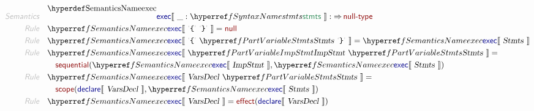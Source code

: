 \begin{align*}
  \KEY{Semantics} \quad
  & \SEMDECL{exec} \LEFTPHRASE \ \_ : \SYNREF{stmts} \ \RIGHTPHRASE  
    :  \TO \NAMEHYPER{../../../../../Funcons-beta/Values/Primitive}{Null}{null-type} 
\\
  \KEY{Rule} \quad
    & \SEMREF{exec} \LEFTPHRASE \
                            \LEX{{\LEFTBRACE}} \ \LEX{{\RIGHTBRACE}} \
                          \RIGHTPHRASE  = 
      \NAMEHYPER{../../../../../Funcons-beta/Values/Primitive}{Null}{null}
\\
  \KEY{Rule} \quad
    & \SEMREF{exec} \LEFTPHRASE \
                            \LEX{{\LEFTBRACE}} \ \VARREF{Stmts} \ \LEX{{\RIGHTBRACE}} \
                          \RIGHTPHRASE  = 
      \SEMREF{exec} \LEFTPHRASE \
                            \VAR{Stmts} \
                          \RIGHTPHRASE 
\\
  \KEY{Rule} \quad
    & \SEMREF{exec} \LEFTPHRASE \
                            \VARREF{ImpStmt} \ \VARREF{Stmts} \
                          \RIGHTPHRASE  = \\&\quad
      \NAMEHYPER{../../../../../Funcons-beta/Computations/Normal}{Flowing}{sequential}
        (  \SEMREF{exec} \LEFTPHRASE \
                                    \VAR{ImpStmt} \
                                  \RIGHTPHRASE , 
               \SEMREF{exec} \LEFTPHRASE \
                                    \VAR{Stmts} \
                                  \RIGHTPHRASE  )
\\
  \KEY{Rule} \quad
    & \SEMREF{exec} \LEFTPHRASE \
                            \VARHYPER{../.}{SIMPLE-4-Declarations}{VarsDecl} \ \VARREF{Stmts} \
                          \RIGHTPHRASE  = \\&\quad
      \NAMEHYPER{../../../../../Funcons-beta/Computations/Normal}{Binding}{scope}
        (  \SEMHYPER{../.}{SIMPLE-4-Declarations}{declare} \LEFTPHRASE \
                                    \VAR{VarsDecl} \
                                  \RIGHTPHRASE , 
               \SEMREF{exec} \LEFTPHRASE \
                                    \VAR{Stmts} \
                                  \RIGHTPHRASE  )
\\
  \KEY{Rule} \quad
    & \SEMREF{exec} \LEFTPHRASE \
                            \VARHYPER{../.}{SIMPLE-4-Declarations}{VarsDecl} \
                          \RIGHTPHRASE  = 
      \NAMEHYPER{../../../../../Funcons-beta/Computations/Normal}{Flowing}{effect}
        (  \SEMHYPER{../.}{SIMPLE-4-Declarations}{declare} \LEFTPHRASE \
                                    \VAR{VarsDecl} \
                                  \RIGHTPHRASE  )

\end{align*}
